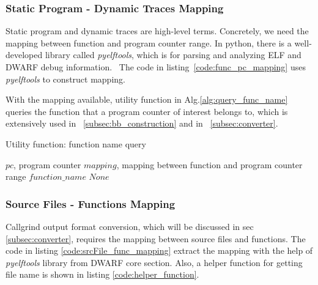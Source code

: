 \subsubsection{Static Program - Dynamic Traces Mapping}
\label{subsubsec:pc_func_mapping}

Static program and dynamic traces are high-level terms. Concretely, we need the mapping between function and program counter range. In python, there is a well-developed library called \textit{pyelftools}, which is for parsing and analyzing ELF and DWARF debug information.~\cite{pyelftools_manual} The code in listing~\ref{code:func_pc_mapping} uses \textit{pyelftools} to construct mapping.

With the mapping available, utility function in Alg.\ref{alg:query_func_name} queries the function that a program counter of interest belongs to, which is extensively used in ~\ref{subsec:bb_construction} and in ~\ref{subsec:converter}.

\medskip
\begin{algorithm}
\caption{Utility function: function name query}
\label{alg:query_func_name}
\begin{algorithmic}
\REQUIRE $pc$, program counter
\REQUIRE $mapping$, mapping between function and program counter range
        \RETURN $function\_name$
    \ELSE
        \RETURN $None$
    \ENDIF
\ENDFOR
\end{algorithmic}
\end{algorithm}

\subsubsection{Source Files - Functions Mapping}
Callgrind output format conversion, which will be discussed in sec \ref{subsec:converter}, requires the mapping between source files and functions. The code in listing \ref{code:srcFile_func_mapping} extract the mapping with the help of \textit{pyelftools} library from DWARF core section. Also, a helper function for getting file name is shown in listing \ref{code:helper_function}.

\medskip

